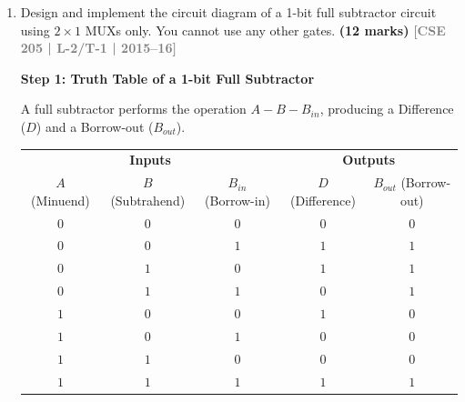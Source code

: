 \documentclass[12pt,a3paper]{article}
\newcommand{\yr}[1]{\hfill\textcolor{gray}{\small\textbf{[#1]}}}
\newcommand{\mk}[1]{\textcolor{orange!70!black}{\small\textbf{(#1 marks)}}}
\begin{document}
\begin{enumerate}
\begin{tcolorbox}[enhanced,breakable,ansbox,colback=cD!4,colframe=cD,boxrule=0.8pt,arc=5pt,title={\textbf{Answer}},fonttitle=\bfseries\color{white},colbacktitle=cD]
\begin{center}
\end{center}

\end{tcolorbox}

\item Design and implement the circuit diagram of a 1-bit full subtractor circuit using $2\times1$ MUXs only. You cannot use any other gates.
\mk{12} \yr{CSE 205 | L-2/T-1 | 2015--16}

\begin{tcolorbox}[enhanced,breakable,ansbox,colback=cD!4,colframe=cD,boxrule=0.8pt,arc=5pt,title={\textbf{Answer}},fonttitle=\bfseries\color{white},colbacktitle=cD]

\textbf{Step 1: Truth Table of a 1-bit Full Subtractor}

A full subtractor performs the operation $A - B - B_{in}$, producing a Difference ($D$) and a Borrow-out ($B_{out}$). 

\begin{center}
\renewcommand{\arraystretch}{1.2}
\begin{tabular}{ccc|cc}
\toprule
\multicolumn{3}{c|}{\textbf{Inputs}} & \multicolumn{2}{c}{\textbf{Outputs}} \\
$A$ (Minuend) & $B$ (Subtrahend) & $B_{in}$ (Borrow-in) & $D$ (Difference) & $B_{out}$ (Borrow-out) \\
\midrule
$0$ & $0$ & $0$ & $0$ & $0$ \\
$0$ & $0$ & $1$ & $1$ & $1$ \\
$0$ & $1$ & $0$ & $1$ & $1$ \\
$0$ & $1$ & $1$ & $0$ & $1$ \\
\midrule
$1$ & $0$ & $0$ & $1$ & $0$ \\
$1$ & $0$ & $1$ & $0$ & $0$ \\
$1$ & $1$ & $0$ & $0$ & $0$ \\
$1$ & $1$ & $1$ & $1$ & $1$ \\
\bottomrule
\end{tabular}
\end{center}


\end{tcolorbox}
\end{enumerate}
\end{document}
